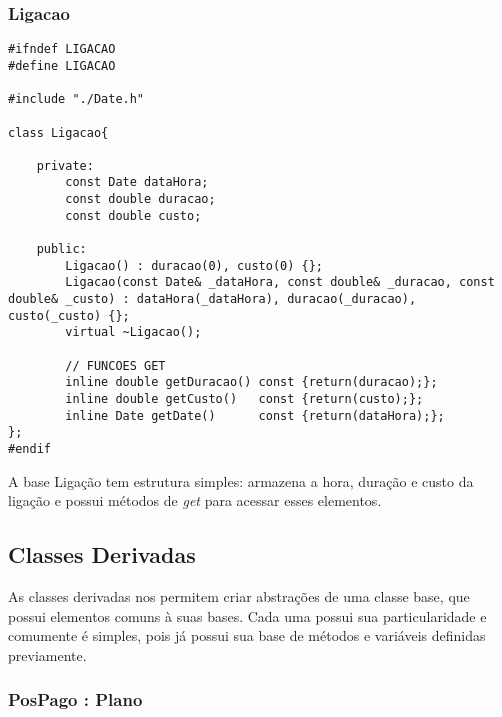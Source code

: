 \pagebreak

\subsubsection{Ligacao} \label{sec:ligacao}

\begin{lstlisting}[basicstyle=\tiny]
#ifndef LIGACAO
#define LIGACAO

#include "./Date.h"

class Ligacao{

	private:
		const Date dataHora;
		const double duracao;
		const double custo;

	public:
		Ligacao() : duracao(0), custo(0) {};
		Ligacao(const Date& _dataHora, const double& _duracao, const double& _custo) : dataHora(_dataHora), duracao(_duracao), custo(_custo) {};
		virtual ~Ligacao();
		
		// FUNCOES GET
		inline double getDuracao() const {return(duracao);};
		inline double getCusto()   const {return(custo);};
		inline Date getDate()      const {return(dataHora);};
};
#endif
\end{lstlisting}

A base Ligação tem estrutura simples: armazena a hora, duração e custo da ligação e possui métodos de \textit{get} para acessar esses elementos.

\subsection{Classes Derivadas} \label{sec:classes_derivadas}

As classes derivadas nos permitem criar abstrações de uma classe base, que possui elementos comuns à suas bases. Cada uma possui sua particularidade e comumente é simples, pois já possui sua base de métodos e variáveis definidas previamente.

\subsubsection{PosPago : Plano} \label{sec:pospago}

